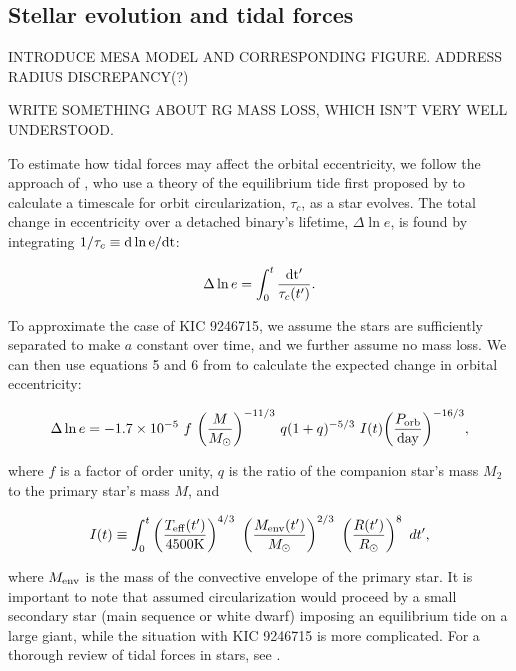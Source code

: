 \subsection{Stellar evolution and tidal forces}\label{tides}

INTRODUCE MESA MODEL AND CORRESPONDING FIGURE. ADDRESS RADIUS DISCREPANCY(?)

WRITE SOMETHING ABOUT RG MASS LOSS, WHICH ISN'T VERY WELL UNDERSTOOD.

To estimate how tidal forces may affect the orbital eccentricity, we follow the approach of \citet{ver95}, who use a theory of the equilibrium tide first proposed by \citet{zah77} to calculate a timescale for orbit circularization, $\tau_c$, as a star evolves. The total change in eccentricity over a detached binary's lifetime, $\Delta \ln e$, is found by integrating $1/\tau_c \equiv \rm{d} \ln e / \rm{d}t$:

\begin{equation}\label{circ}
\Delta \ln e = \int_0^t \frac{\rm{d}t'}{\tau_c(t')}.
\end{equation}

To approximate the case of KIC 9246715, we assume the stars are sufficiently separated to make $a$ constant over time, and we further assume no mass loss. We can then use equations 5 and 6 from \citet{ver95} to calculate the expected change in orbital eccentricity:

\begin{equation}\label{tide1}
\Delta \ln e = -1.7 \times 10^{-5} \ f \ {\left( \frac{M}{M_{\odot}} \right)}^{-11/3} \ q(1+q)^{-5/3} \ I(t) {\left( \frac{P_{\rm{orb}}}{\rm{day}} \right)}^{-16/3},
\end{equation}

where $f$ is a factor of order unity, $q$ is the ratio of the companion star's mass $M_2$ to the primary star's mass $M$, and

\begin{equation}
I(t) \equiv \int_0^t \left( \frac{T_{\rm{eff}}(t')}{4500 \rm{K}} \right)^{4/3} \ \left( \frac{M_{\rm{env}}(t')}{M_{\odot}} \right)^{2/3} \ \left( \frac{R(t')}{R_{\odot}} \right)^8 \ dt',
\end{equation}

where $M_{\rm{env}}$ is the mass of the convective envelope of the primary star. It is important to note that \citet{ver95} assumed circularization would proceed by a small secondary star (main sequence or white dwarf) imposing an equilibrium tide on a large giant, while the situation with KIC 9246715 is more complicated. For a thorough review of tidal forces in stars, see \citet{ogi14}.

